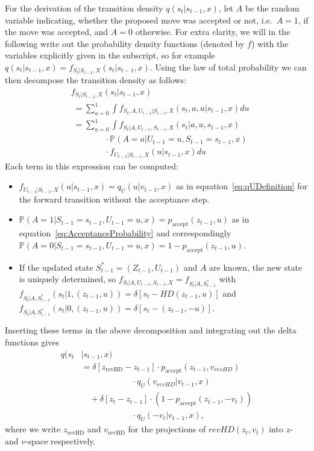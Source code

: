 For the derivation of the transition density $q(s_t|s_{t-1}, x)$, let $A$ be the random variable indicating, whether the proposed move was accepted or not, i.e.\ $A=1$, if the move was accepted, and $A=0$ otherwise. For extra clarity, we will in the following write out the probability density functions (denoted by $f$) with the variables explicitly given in the subscript, so for example $q(s_t|s_{t-1}, x) = f_{S_t|S_{t-1}, X}(s_t|s_{t-1}, x)$. Using the law of total probability we can then decompose the transition density as follows:
\begin{equation}
\begin{split}
&f_{S_t|S_{t-1}, X}(s_t|s_{t-1}, x)\\
&\;=\sum_{a=0}^1 \int f_{S_t, A, U_{t-1}|S_{t-1}, X}(s_t, a, u|s_{t-1}, x) du \\
&\;=\sum_{a=0}^1 \int f_{S_t|A, U_{t-1}, S_{t-1}, X}(s_t| a, u, s_{t-1}, x) \\
&\qquad\qquad\cdot \mathbb{P}(A = a|U_{t-1} = u, S_{t-1} = s_{t-1}, x) \\
&\qquad\qquad \cdot f_{U_{t-1}|S_{t-1}, X}(u|s_{t-1}, x) du
\end{split}
\end{equation}
Each term in this expression can be computed:
\begin{itemize}
\item $f_{U_{t-1}|S_{t-1}, X}(u|s_{t-1}, x) = q_U(u|v_{t-1}, x)$ as in equation~\eqref{eq:qUDefinition} for the forward transition without the acceptance step.
\item $\mathbb{P}(A=1|S_{t-1} = s_{t-1}, U_{t-1} = u, x) = p_{\textrm{accept}}(z_{t-1}, u)$ as in equation~\eqref{eq:AcceptanceProbability} and correspondingly $\mathbb{P}(A=0|S_{t-1} = s_{t-1}, U_{t-1} = u, x) = 1- p_{\textrm{accept}}(z_{t-1}, u)$.
\item If the updated state $S^*_{t-1} = (Z_{t-1}, U_{t-1})$ and $A$ are known, the new state is uniquely determined, so $f_{S_t|A, U_{t-1}, S_{t-1}, X} = f_{S_t|A, S^*_{t-1}}$ with $f_{S_t|A, S^*_{t-1}}(s_t| 1, (z_{t-1}, u)) = \delta \left[s_t - HD(z_{t-1}, u) \right]$ and $f_{S_t|A, S^*_{t-1}}(s_t| 0, (z_{t-1}, u)) = \delta \left[s_t - (z_{t-1}, -u) \right]$.
\end{itemize}

Inserting these terms in the above decomposition and integrating out the delta functions gives
\begin{equation}
\begin{split}
q(s_t& |s_{t-1}, x) \\
&= \delta \left[z_{\textrm{revHD}} - z_{t-1} \right] \cdot p_{\textrm{accept}}(z_{t-1}, v_{revHD}) \\
&\qquad\qquad\qquad \cdot q_U(v_{revHD}|v_{t-1}, x) \\
&\quad + \delta \left[ z_t - z_{t-1} \right] \cdot (1 - p_{\textrm{accept}}(z_{t-1}, -v_t)) \\
&\qquad\qquad\qquad \cdot q_U(-v_t|v_{t-1}, x),
\end{split}
\end{equation}
where we write $z_{\textrm{revHD}}$ and $v_{\textrm{revHD}}$ for the projections of $revHD(z_t, v_t)$ into $z$- and $v$-space respectively.

